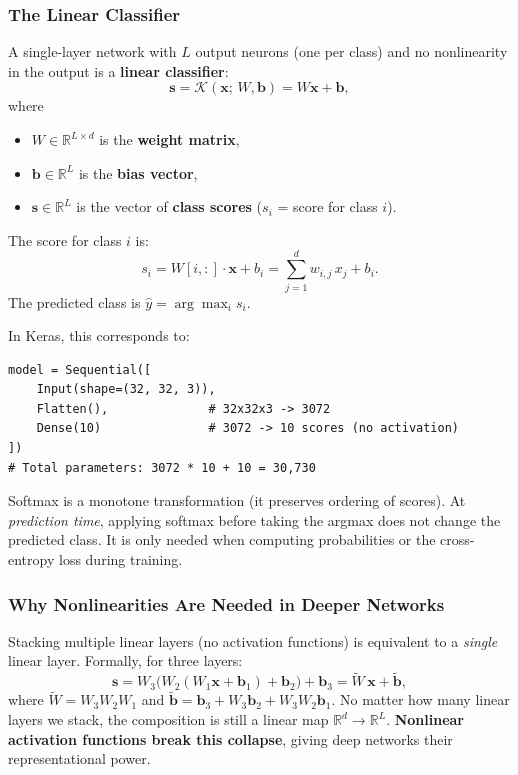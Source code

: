 \documentclass[11pt,a4paper]{article}
\begin{document}
\subsubsection{The Linear Classifier}

A single-layer network with $L$ output neurons (one per class) and no nonlinearity in the output
is a \textbf{linear classifier}:
\[
  \mathbf{s} = \mathcal{K}(\mathbf{x};\, W, \mathbf{b}) = W\mathbf{x} + \mathbf{b},
\]
where
\begin{itemize}
  \item $W \in \mathbb{R}^{L \times d}$ is the \textbf{weight matrix},
  \item $\mathbf{b} \in \mathbb{R}^L$ is the \textbf{bias vector},
  \item $\mathbf{s} \in \mathbb{R}^L$ is the vector of \textbf{class scores} ($s_i$ = score for class $i$).
\end{itemize}
The score for class $i$ is:
\[
  s_i = W[i, :] \cdot \mathbf{x} + b_i
       = \sum_{j=1}^{d} w_{i,j}\, x_j + b_i.
\]
The predicted class is $\hat{y} = \arg\max_i s_i$.

In Keras, this corresponds to:
\begin{lstlisting}
model = Sequential([
    Input(shape=(32, 32, 3)),
    Flatten(),              # 32x32x3 -> 3072
    Dense(10)               # 3072 -> 10 scores (no activation)
])
# Total parameters: 3072 * 10 + 10 = 30,730
\end{lstlisting}

\begin{notebox}
Softmax is a monotone transformation (it preserves ordering of scores).  At \emph{prediction time},
applying softmax before taking the argmax does not change the predicted class.  It is only needed
when computing probabilities or the cross-entropy loss during training.
\end{notebox}

\subsubsection{Why Nonlinearities Are Needed in Deeper Networks}

Stacking multiple linear layers (no activation functions) is equivalent to a \emph{single} linear layer.
Formally, for three layers:
\[
  \mathbf{s} = W_3\bigl(W_2(W_1\mathbf{x} + \mathbf{b}_1) + \mathbf{b}_2\bigr) + \mathbf{b}_3
             = \widetilde{W}\,\mathbf{x} + \tilde{\mathbf{b}},
\]
where $\widetilde{W} = W_3 W_2 W_1$ and $\tilde{\mathbf{b}} = \mathbf{b}_3 + W_3\mathbf{b}_2 + W_3W_2\mathbf{b}_1$.
No matter how many linear layers we stack, the composition is still a linear map $\mathbb{R}^d \to \mathbb{R}^L$.
\textbf{Nonlinear activation functions break this collapse}, giving deep networks their representational power.
\end{document}

